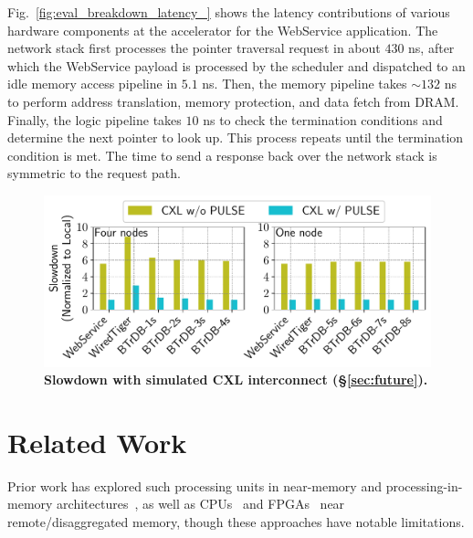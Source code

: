Fig.~\ref{fig:eval_breakdown_latency_} shows the latency contributions of various hardware components at the \pulse accelerator for the WebService application. The network stack first processes the pointer traversal request in about $430$ ns, after which the WebService payload is processed by the scheduler and dispatched to an idle memory access pipeline in $5.1$ ns. Then, the memory pipeline takes $\sim$$132$ ns to perform address translation, memory protection, and data fetch from DRAM. Finally, the logic pipeline takes $10$ ns to check the termination conditions and determine the next pointer to look up. This process repeats until the termination condition is met. The time to send a response back over the network stack is symmetric to the request path.












\begin{figure}[t]
\centering
\includegraphics[width=0.9\columnwidth]{fig/pulse/cxl.pdf}
\vspace{-1em}
\caption[Slowdown with simulated CXL interconnect]{\textbf{Slowdown with simulated CXL interconnect (\S\ref{sec:future}).} }

\label{fig:eval_cxl}
\end{figure}


\section{Related Work}

Prior work has explored such processing units in near-memory and processing-in-memory architectures~\cite{ahn2015scalable, asghari2016chameleon, dai2018graphh, schuiki2018scalable, mutlu2019processing, lockerman2020livia, tu2022redcim, devic2022_PIM, wang2022_Nearstream, xie2023mpu, mutlu2022modern, oliveira2022accelerating, eckert2022eidetic, chi2016prime, seshadri2017simple, kwon2019_TensorDIMM, boroumand2019_codna, cho2020_data, ke2020_RecNMP, wang2021stream, xie2021spacea, ke2021near, singh2021fpga, olgun2022pidram, dai2022dimmining, gu2020ipim, gomez2023evaluating, walkers, impica}, as well as CPUs~\cite{storagefunctions, splinter, aifm, kayak_nsdi_21, storm_systor_19, zhang2022_teleport} and FPGAs~\cite{clio, strom} near remote/disaggregated memory, though these approaches have notable limitations.

